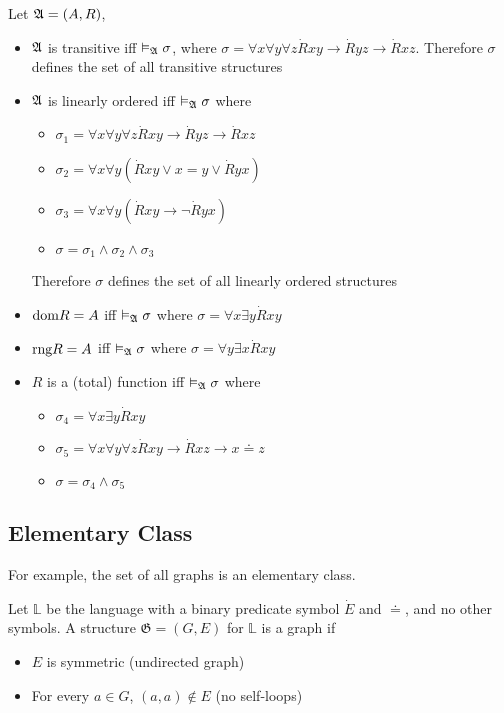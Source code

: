 Let $\mathfrak{A} = (A,R)$,
\begin{itemize}
    \item $\mathfrak{A}$ is transitive iff $\vDash_{\mathfrak{A}}\sigma$, where $\sigma=\forall x \forall y \forall z \dot{R}xy \to \dot{R}yz \to \dot{R}xz$. Therefore $\sigma$ defines the set of all transitive structures
    \item $\mathfrak{A}$ is linearly ordered iff $\vDash_{\mathfrak{A}}\sigma$ where
    \begin{itemize}
        \item $\sigma_1 = \forall x \forall y \forall z \dot{R}xy \to \dot{R}yz \to \dot{R}xz$
        \item $\sigma_2 = \forall x \forall y (\dot{R}xy \vee x=y \vee \dot{R}yx)$
        \item $\sigma_3 = \forall x \forall y (\dot{R}xy \to \neg\dot{R}yx)$
        \item $\sigma = \sigma_1 \wedge \sigma_2 \wedge \sigma_3$
    \end{itemize}
    Therefore $\sigma$ defines the set of all linearly ordered structures
    \item $\textrm{dom}{R} = A$ iff $\vDash_{\mathfrak{A}}\sigma$ where $\sigma = \forall x \exists y \dot{R}xy$
    \item $\textrm{rng}{R} = A$ iff $\vDash_{\mathfrak{A}}\sigma$ where $\sigma = \forall y \exists x \dot{R}xy$
    \item $R$ is a (total) function iff $\vDash_{\mathfrak{A}}\sigma$ where
    \begin{itemize}
        \item $\sigma_4 =  \forall x \exists y \dot{R}xy$
        \item $\sigma_5 = \forall x \forall y \forall z \dot{R}xy \to \dot{R}xz \to x \doteq z$
        \item $\sigma = \sigma_4 \wedge \sigma_5$
    \end{itemize}
\end{itemize}

\subsection{Elementary Class}

For example, the set of all graphs is an elementary class.

Let $\mathbb{L}$ be the language with a binary predicate symbol $\dot{E}$ and $\doteq$, and no other symbols. A structure $\mathfrak{G} = (G, E)$ for $\mathbb{L}$ is a graph if
\begin{itemize}
    \item $E$ is symmetric (undirected graph)
    \item For every $a \in G$, $(a, a) \notin E$ (no self-loops)
\end{itemize}

